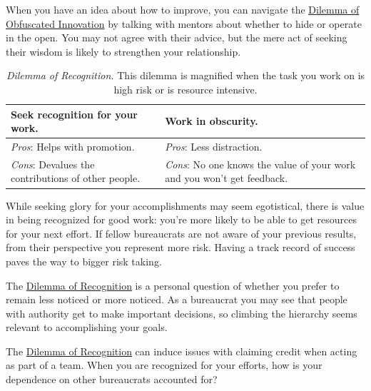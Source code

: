 When you have an idea about how to improve, you can navigate the \hyperref[table:innovate-open-obscure]{Dilemma of Obfuscated Innovation} by talking with mentors about whether to hide or operate in the open. You may not agree with their advice, but the mere act of seeking their wisdom is likely to strengthen your relationship. 



\begin{center}
\begin{table}[H] %
\begin{tabular}{ | m{\dilemmatablewidth}| m{\dilemmatablewidth} | } 
  \hline
  \textbf{Seek recognition for your work.} &
  \textbf{Work in obscurity.} \\
  \hline
  \textit{Pros}: Helps with promotion. & 
  \textit{Pros}: Less distraction. \\
  \hline
  \textit{Cons}: Devalues the contributions of other people. & 
  \textit{Cons}: No one knows the value of your work and you won't get feedback. \\
  \hline
\end{tabular}
\caption{
\textit{Dilemma of Recognition.}
This dilemma is magnified when the task you work on is high risk or is resource intensive. 
}
\label{table:recognition-obscurity}
\end{table}
\end{center}

While seeking glory for your accomplishments may seem egotistical, there is value in being recognized for good work: you're more likely to be able to get resources for your next effort. If fellow bureaucrats are not aware of your previous results, from their perspective you represent more risk. Having a track record of success paves the way to bigger risk taking.

The \hyperref[table:recognition-obscurity]{Dilemma of Recognition} is a personal question of whether you prefer to remain less noticed or more noticed. As a bureaucrat you may see that people with authority get to make important decisions, so climbing the hierarchy seems relevant to accomplishing your goals. 

The \hyperref[table:recognition-obscurity]{Dilemma of Recognition} can induce issues with claiming credit when acting as part of a team. When you are recognized for your efforts, how is your dependence on other bureaucrats accounted for?

